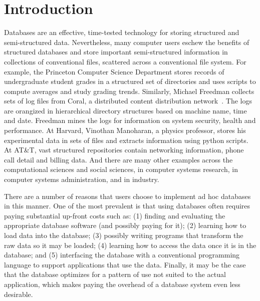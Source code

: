 \section {Introduction}
\label{sec:intro}

%
Databases are an effective, time-tested technology for storing
structured and semi-structured data.  Nevertheless, many computer
users eschew the benefits of structured databases and store important
semi-structured information in collections of conventional files,
scattered across a conventional file system.  For example, the
Princeton Computer Science Department
stores records of undergraduate student grades in a structured set of
directories and uses scripts to compute averages and
study grading trends.  Similarly, Michael Freedman collects
sets of log files from Coral, a distributed content distribution
network~\cite{freedman+:coral,freedman:coral-experience}.  
The logs are orangized in hierarchical
directory structures based on machine name, time and date.  Freedman
mines the logs for information on system security, health and performance.  At
Harvard, Vinothan Manoharan, a physics professor, stores 
his experimental data in sets of files and
extracts information using python scripts.  At AT\&T, vast structured
repositories contain networking information,
phone call detail and billing data.  And there are
many other examples across the computational sciences and social
sciences, in computer systems research, in computer
systems administration, and in industry.

There are a number of reasons that users choose to implement ad hoc
databases in this manner.  One of the most prevalent is that using
databases often requires paying substantial up-front costs such as:
(1) finding and evaluating the appropriate database software (and
possibly paying for it); (2) learning how to load data into the
database; (3) possibly writing programs that transform the raw data 
so it may be loaded; (4) learning how
to access the data once it is in the database; and (5) interfacing the
database with a conventional programming language to support
applications that use the data.  Finally, it may be the case that the
database optimizes for a pattern of use not suited to the actual
application, which makes paying the overhead of a database system even
less desirable. 

